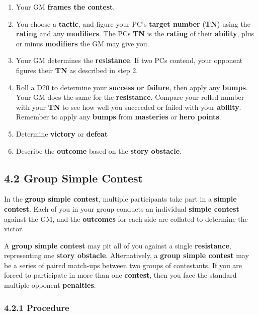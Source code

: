 \documentclass[
]{article}
\providecommand{\tightlist}{%
  \setlength{\itemsep}{0pt}\setlength{\parskip}{0pt}}
\begin{document}
\begin{enumerate}
\def\labelenumi{\arabic{enumi}.}
\tightlist
\item
  Your GM \textbf{frames the contest}.
\item
  You choose a \textbf{tactic}, and figure your PC's \textbf{target
  number} (\textbf{TN}) using the \textbf{rating} and any
  \textbf{modifiers}. The PCs \textbf{TN} is the \textbf{rating} of
  their \textbf{ability}, plus or minus \textbf{modifiers} the GM may
  give you.
\item
  Your GM determines the \textbf{resistance}. If two PCs contend, your
  opponent figures their \textbf{TN} as described in step 2.
\item
  Roll a D20 to determine your \textbf{success or failure}, then apply
  any \textbf{bumps}. Your GM does the same for the \textbf{resistance}.
  Compare your rolled number with your \textbf{TN} to see how well you
  succeeded or failed with your \textbf{ability}. Remember to apply any
  \textbf{bumps} from \textbf{masteries} or \textbf{hero points}.
\item
  Determine \textbf{victory} or \textbf{defeat}
\item
  Describe the \textbf{outcome} based on the \textbf{story obstacle}.
\end{enumerate}

\hypertarget{group-simple-contest}{%
\subsection{4.2 Group Simple Contest}\label{group-simple-contest}}

In the \textbf{group simple contest}, multiple participants take part in
a \textbf{simple contest}. Each of you in your group conducts an
individual \textbf{simple contest} against the GM, and the
\textbf{outcomes} for each side are collated to determine the victor.

A \textbf{group simple contest} may pit all of you against a single
\textbf{resistance}, representing one \textbf{story obstacle}.
Alternatively, a \textbf{group simple contest} may be a series of paired
match-ups between two groups of contestants. If you are forced to
participate in more than one \textbf{contest}, then you face the
standard multiple opponent \textbf{penalties}.

\hypertarget{procedure-1}{%
\subsubsection{4.2.1 Procedure}\label{procedure-1}}
\end{document}
